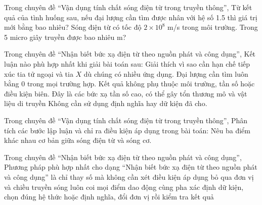 \begin{ex}
Trong chuyên đề “Vận dụng tính chất sóng điện từ trong truyền thông”, Từ kết quả của tình huống sau, nếu đại lượng cần tìm được nhân với hệ số 1.5 thì giá trị mới bằng bao nhiêu? Sóng điện từ có tốc độ $2\times10^8$ m/s trong môi trường. Trong 5 micro giây truyền được bao nhiêu m?
\end{ex}

\begin{ex}
Trong chuyên đề “Nhận biết bức xạ điện từ theo nguồn phát và công dụng”, Kết luận nào phù hợp nhất khi giải bài toán sau: Giải thích vì sao cần hạn chế tiếp xúc tia tử ngoại và tia $X$ dù chúng có nhiều ứng dụng.
\choice
{Đại lượng cần tìm luôn bằng 0 trong mọi trường hợp.}
{Kết quả không phụ thuộc môi trường, tần số hoặc điều kiện biên.}
{\True Đây là các bức xạ tần số cao, có thể gây tổn thương mô và vật liệu di truyền}
{Không cần sử dụng định nghĩa hay dữ kiện đã cho.}
\end{ex}

\begin{ex}
Trong chuyên đề “Vận dụng tính chất sóng điện từ trong truyền thông”, Phân tích các bước lập luận và chỉ ra điều kiện áp dụng trong bài toán: Nêu ba điểm khác nhau cơ bản giữa sóng điện từ và sóng cơ.
\choiceTF

\end{ex}

\begin{ex}
Trong chuyên đề “Nhận biết bức xạ điện từ theo nguồn phát và công dụng”, Phương pháp phù hợp nhất cho dạng “Nhận biết bức xạ điện từ theo nguồn phát và công dụng” là
\choice
{chỉ thay số mà không cần xét điều kiện áp dụng}
{bỏ qua đơn vị và chiều truyền sóng}
{luôn coi mọi điểm dao động cùng pha}
{\True xác định dữ kiện, chọn đúng hệ thức hoặc định nghĩa, đổi đơn vị rồi kiểm tra kết quả}
\end{ex}

